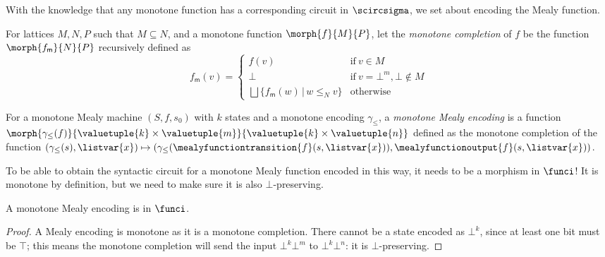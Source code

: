 With the knowledge that any monotone function has a corresponding circuit
in \(\scircsigma\), we set about encoding the Mealy function.

\begin{definition}
    For lattices \(M, N, P\) such that \(M \subseteq N\), and a monotone
    function \(\morph{f}{M}{P}\), let the \emph{monotone completion} of \(f\) be
    the function \(\morph{f_\mathsf{m}}{N}{P}\) recursively defined as \[
        f_\mathsf{m}(v) = \begin{cases}
            f(v)
            &
            \text{if}\ v \in M
            \\
            \bot
            &
            \text{if}\ v = \bot^m, \bot \not\in M
            \\
            \bigsqcup \{ f_\mathsf{m}(w) \,|\, w \leq_N v \}
            &
            \text{otherwise}
        \end{cases}
    \]
\end{definition}

\begin{definition}\label{def:mealy-encoding}
    For a monotone Mealy machine \((S, f, s_0)\) with \(k\) states and a
    monotone encoding \(\gamma_\leq\), a \emph{monotone Mealy encoding} is a
    function
    \(
        \morph{
            \gamma_\leq(f)
        }{
            \valuetuple{k} \times \valuetuple{m}
        }{
            \valuetuple{k} \times \valuetuple{n}
        }
    \) defined as the monotone completion of the function \(
        (\gamma_\leq(s), \listvar{x})
        \mapsto
            (
                \gamma_\leq(\mealyfunctiontransition{f}(s, \listvar{x})),
                \mealyfunctionoutput{f}(s, \listvar{x})
            )
    \).
\end{definition}

To be able to obtain the syntactic circuit for a monotone Mealy function encoded
in this way, it needs to be a morphism in \(\funci\)!
It is monotone by definition, but we need to make sure it is also
\(\bot\)-preserving.

\begin{lemma}
    A monotone Mealy encoding is in \(\funci\).
\end{lemma}
\begin{proof}
    A Mealy encoding is monotone as it is a monotone completion.
    There cannot be a state encoded as \(\bot^k\), since at least one bit must
    be \(\top\); this means the monotone completion will send the input
    \(\bot^k\bot^m\) to \(\bot^k\bot^n\): it is
    \(\bot\)-preserving.
\end{proof}

